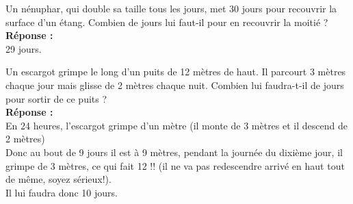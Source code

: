 \documentclass[twocolumn]{article}
\begin{document}
\exo
\par
Un nénuphar, qui double sa taille tous les jours, met 30 jours pour recouvrir 
la surface d'un étang. Combien de jours lui faut-il pour en recouvrir la 
moitié ?\\

\textbf{Réponse :}\\

29 jours.

\par
\vspace{3mm}

\exo
\par
Un escargot grimpe le long d'un puits de 12 mètres de haut. Il parcourt 3 mètres chaque 
jour mais glisse de 2 mètres chaque nuit. Combien lui faudra-t-il de jours pour sortir 
de ce puits ?\\

\textbf{Réponse :}\\

En 24 heures, l'escargot grimpe d'un mètre (il monte de 3 mètres et il descend de 2 
mètres)\\

Donc au bout de 9 jours il est à 9 mètres, pendant la journée du dixième jour,
il grimpe de 3 mètres, ce qui fait 12 !! (il ne va pas redescendre arrivé en haut 
tout de même, soyez sérieux!).\\

Il lui faudra donc 10 jours.
\par
\vspace{3mm}
\end{document}
